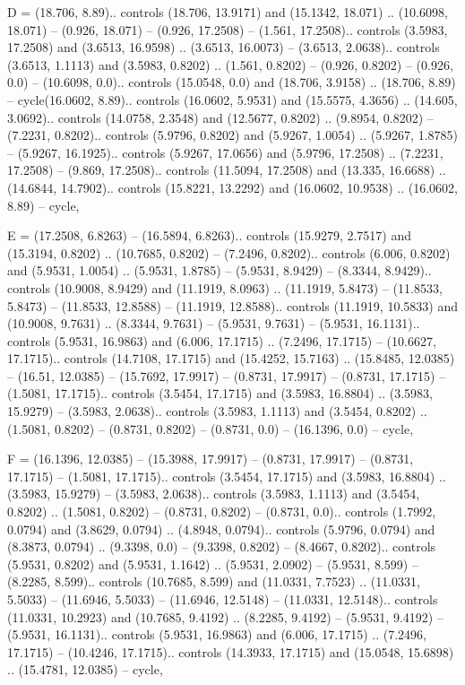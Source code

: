 D = {(18.706, 8.89).. controls (18.706, 13.9171) and (15.1342, 18.071) .. (10.6098, 18.071) -- (0.926, 18.071) -- (0.926, 17.2508) -- (1.561, 17.2508).. controls (3.5983, 17.2508) and (3.6513, 16.9598) .. (3.6513, 16.0073) -- (3.6513, 2.0638).. controls (3.6513, 1.1113) and (3.5983, 0.8202) .. (1.561, 0.8202) -- (0.926, 0.8202) -- (0.926, 0.0) -- (10.6098, 0.0).. controls (15.0548, 0.0) and (18.706, 3.9158) .. (18.706, 8.89) -- cycle(16.0602, 8.89).. controls (16.0602, 5.9531) and (15.5575, 4.3656) .. (14.605, 3.0692).. controls (14.0758, 2.3548) and (12.5677, 0.8202) .. (9.8954, 0.8202) -- (7.2231, 0.8202).. controls (5.9796, 0.8202) and (5.9267, 1.0054) .. (5.9267, 1.8785) -- (5.9267, 16.1925).. controls (5.9267, 17.0656) and (5.9796, 17.2508) .. (7.2231, 17.2508) -- (9.869, 17.2508).. controls (11.5094, 17.2508) and (13.335, 16.6688) .. (14.6844, 14.7902).. controls (15.8221, 13.2292) and (16.0602, 10.9538) .. (16.0602, 8.89) -- cycle},

E = {(17.2508, 6.8263) -- (16.5894, 6.8263).. controls (15.9279, 2.7517) and (15.3194, 0.8202) .. (10.7685, 0.8202) -- (7.2496, 0.8202).. controls (6.006, 0.8202) and (5.9531, 1.0054) .. (5.9531, 1.8785) -- (5.9531, 8.9429) -- (8.3344, 8.9429).. controls (10.9008, 8.9429) and (11.1919, 8.0963) .. (11.1919, 5.8473) -- (11.8533, 5.8473) -- (11.8533, 12.8588) -- (11.1919, 12.8588).. controls (11.1919, 10.5833) and (10.9008, 9.7631) .. (8.3344, 9.7631) -- (5.9531, 9.7631) -- (5.9531, 16.1131).. controls (5.9531, 16.9863) and (6.006, 17.1715) .. (7.2496, 17.1715) -- (10.6627, 17.1715).. controls (14.7108, 17.1715) and (15.4252, 15.7163) .. (15.8485, 12.0385) -- (16.51, 12.0385) -- (15.7692, 17.9917) -- (0.8731, 17.9917) -- (0.8731, 17.1715) -- (1.5081, 17.1715).. controls (3.5454, 17.1715) and (3.5983, 16.8804) .. (3.5983, 15.9279) -- (3.5983, 2.0638).. controls (3.5983, 1.1113) and (3.5454, 0.8202) .. (1.5081, 0.8202) -- (0.8731, 0.8202) -- (0.8731, 0.0) -- (16.1396, 0.0) -- cycle},

F = {(16.1396, 12.0385) -- (15.3988, 17.9917) -- (0.8731, 17.9917) -- (0.8731, 17.1715) -- (1.5081, 17.1715).. controls (3.5454, 17.1715) and (3.5983, 16.8804) .. (3.5983, 15.9279) -- (3.5983, 2.0638).. controls (3.5983, 1.1113) and (3.5454, 0.8202) .. (1.5081, 0.8202) -- (0.8731, 0.8202) -- (0.8731, 0.0).. controls (1.7992, 0.0794) and (3.8629, 0.0794) .. (4.8948, 0.0794).. controls (5.9796, 0.0794) and (8.3873, 0.0794) .. (9.3398, 0.0) -- (9.3398, 0.8202) -- (8.4667, 0.8202).. controls (5.9531, 0.8202) and (5.9531, 1.1642) .. (5.9531, 2.0902) -- (5.9531, 8.599) -- (8.2285, 8.599).. controls (10.7685, 8.599) and (11.0331, 7.7523) .. (11.0331, 5.5033) -- (11.6946, 5.5033) -- (11.6946, 12.5148) -- (11.0331, 12.5148).. controls (11.0331, 10.2923) and (10.7685, 9.4192) .. (8.2285, 9.4192) -- (5.9531, 9.4192) -- (5.9531, 16.1131).. controls (5.9531, 16.9863) and (6.006, 17.1715) .. (7.2496, 17.1715) -- (10.4246, 17.1715).. controls (14.3933, 17.1715) and (15.0548, 15.6898) .. (15.4781, 12.0385) -- cycle},

